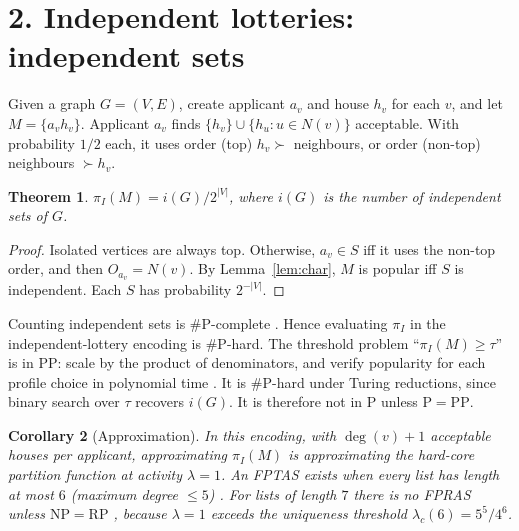 \documentclass[11pt]{article}
\newtheorem{theorem}{Theorem}
\newtheorem{corollary}[theorem]{Corollary}
\theoremstyle{definition}
\begin{document}
\section*{2. Independent lotteries: independent sets}
Given a graph $G=(V,E)$, create applicant $a_v$ and house $h_v$ for each $v$, and let $M=\{a_vh_v\}$. Applicant $a_v$
finds $\{h_v\}\cup\{h_u:u\in N(v)\}$ acceptable. With probability $1/2$ each, it uses order (top) $h_v\succ$ neighbours,
or order (non-top) neighbours $\succ h_v$.
\begin{theorem}\label{thm:lot}
$\pi_I(M)=i(G)/2^{|V|}$, where $i(G)$ is the number of independent sets of $G$.
\end{theorem}
\begin{proof}
Isolated vertices are always top. Otherwise, $a_v\in S$ iff it uses the non-top order, and then $O_{a_v}=N(v)$. By
Lemma~\ref{lem:char}, $M$ is popular iff $S$ is independent. Each $S$ has probability $2^{-|V|}$.
\end{proof}
Counting independent sets is \#P-complete \cite{pb}. Hence evaluating $\pi_I$ in the independent-lottery encoding is
\#P-hard. The threshold problem ``$\pi_I(M)\ge\tau$'' is in PP: scale by the product of denominators, and verify popularity
for each profile choice in polynomial time \cite{aikm}. It is \#P-hard under Turing reductions, since binary search over
$\tau$ recovers $i(G)$. It is therefore not in P unless $\mathrm P=\mathrm{PP}$.

\begin{corollary}[Approximation]
In this encoding, with $\deg(v)+1$ acceptable houses per applicant, approximating $\pi_I(M)$ is approximating the
hard-core partition function at activity $\lambda=1$. An FPTAS exists when every list has length at most $6$ (maximum
degree $\le5$) \cite{weitz}. For lists of length $7$ there is no FPRAS unless $\mathrm{NP}=\mathrm{RP}$ \cite{sly}, because
$\lambda=1$ exceeds the uniqueness threshold $\lambda_c(6)=5^5/4^6$.
\end{corollary}
\end{document}
